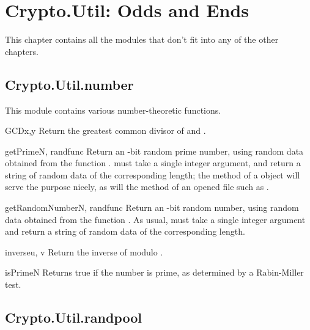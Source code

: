 \documentclass{howto}
\begin{document}
\section{Crypto.Util: Odds and Ends}
This chapter contains all the modules that don't fit into any of the
other chapters.  

\subsection{Crypto.Util.number}

This module contains various number-theoretic functions.  

\begin{funcdesc}{GCD}{x,y}
Return the greatest common divisor of  and .
\end{funcdesc}

\begin{funcdesc}{getPrime}{N, randfunc}
Return an -bit random prime number, using random data obtained
from the function .   must take a single
integer argument, and return a string of random data of the
corresponding length; the  method of a
 object will serve the purpose nicely, as will the
 method of an opened file such as .
\end{funcdesc}

\begin{funcdesc}{getRandomNumber}{N, randfunc}
Return an -bit random number, using random data obtained from the
function .  As usual,  must take a single
integer argument and return a string of random data of the
corresponding length.
\end{funcdesc}

\begin{funcdesc}{inverse}{u, v}
Return the inverse of  modulo .
\end{funcdesc}

\begin{funcdesc}{isPrime}{N}
Returns true if the number  is prime, as determined by a
Rabin-Miller test.
\end{funcdesc}


\subsection{Crypto.Util.randpool}
\end{document}
